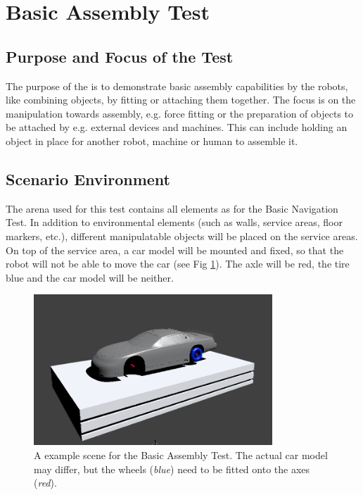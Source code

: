 \newpage
\section{Basic Assembly Test}

\subsection{Purpose and Focus of the Test}
The purpose of the  is to demonstrate basic assembly capabilities by the robots, like combining objects, by fitting or attaching them together.
The focus is on the manipulation towards assembly, e.g. force fitting or the preparation of objects to be attached by e.g. external devices and machines. This can include holding an object in place for another robot, machine or human to assemble it.

\subsection{Scenario Environment}
The arena used for this test contains all elements as for the Basic Navigation Test. In addition to environmental elements (such as walls, service areas, floor markers, etc.), different manipulatable objects will be placed on the service areas. On top of the service area, a car model will be mounted and fixed, so that the robot will not be able to move the car (see Fig \ref{fig:BAT_car}). The axle will be red, the tire blue and the car model will be neither.

\begin{figure} [h!]
\centering
\includegraphics[width=0.8\textwidth ]{./images/BAT.png}
\caption{A example scene for the Basic Assembly Test. The actual car model may differ, but the wheels (\emph{blue}) need to be fitted onto the axes (\emph{red}).}
\label{fig:BAT_car}
\end{figure}


